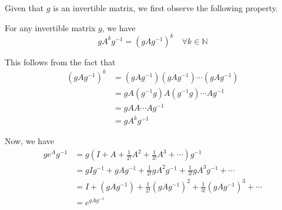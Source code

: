 Given that \( g \) is an invertible matrix, we first observe the following property.

For any invertible matrix \( g \), we have
\begin{equation*}
    g A^{k} g^{-1} = {(g A g^{-1})}^{k} \quad \forall k \in \mathbb{N}
\end{equation*}

This follows from the fact that
\begin{align*}
    {(g A g^{-1})}^{k}
     & =
    (g A g^{-1})(g A g^{-1})\cdots(g A g^{-1})
    \\ & =
    g A (g^{-1} g) A (g^{-1} g) \cdots A g^{-1}
    \\  & =
    g A A \cdots A g^{-1}
    \\ & =
    g A^{k} g^{-1}
\end{align*}

Now, we have
\begin{align*}
    g e^{A} g^{-1}
     & =
    g \left( I+A+\frac{1}{2 !}A^{2}+\frac{1}{3 !}A^{3}+\cdots \right) g^{-1}
    \\ & =
    g I g^{-1}+g A g^{-1}+\frac{1}{2 !}g A^{2} g^{-1}+\frac{1}{3 !}g A^{3} g^{-1}+\cdots
    \\ & =
    I+(g A g^{-1})+\frac{1}{2 !}{(g A g^{-1})}^{2}+\frac{1}{3 !}{(g A g^{-1})}^{3}+\cdots
    \\ & =
    e^{g A g^{-1}}
\end{align*}
